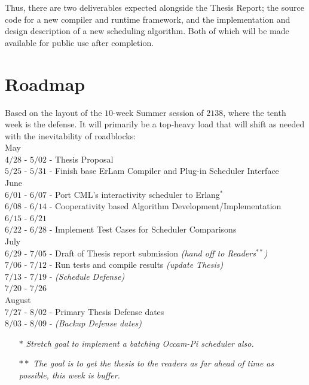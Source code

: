 Thus, there are two deliverables expected alongside the Thesis Report; the source code for a new compiler 
and runtime framework, and the implementation and design description of a new scheduling algorithm. Both
of which will be made available for public use after completion.

\pagebreak
\section{Roadmap}

Based on the layout of the $10$-week Summer session of $2138$, where the tenth week
is the defense. It will primarily be a top-heavy load that will shift as needed
with the inevitability of roadblocks:\\

    May\\
    	$4/28$ - $5/02$ - Thesis Proposal\\
        $5/25$ - $5/31$ - Finish base ErLam Compiler and Plug-in Scheduler Interface \\

    June \\
        $6/01$ - $6/07$ - Port CML's interactivity scheduler to Erlang$^*$\\
        $6/08$ - $6/14$ - Cooperativity based Algorithm Development/Implementation \\
        $6/15$ - $6/21$ \\
        $6/22$ - $6/28$ - Implement Test Cases for Scheduler Comparisons\\

    July\\
        $6/29$ - $7/05$ - Draft of Thesis report submission {\em (hand off to Readers$^{**}$)} \\
        $7/06$ - $7/12$ - Run tests and compile results {\em (update Thesis)} \\
        $7/13$ - $7/19$ - {\em(Schedule Defense)}\\
        $7/20$ - $7/26$ \\

    August\\
        $7/27$ - $8/02$ - Primary Thesis Defense dates\\
        $8/03$ - $8/09$ - {\em(Backup Defense dates)}

\begin{itemize}
\setlength{\itemsep}{1pt}
\setlength{\parskip}{0pt}
\setlength{\parsep}{0pt}
\item[$*$]{\small\em Stretch goal to implement a batching Occam-Pi scheduler also.}
\item[$**$]{\small\em The goal is to get the thesis to the readers as far ahead of time as possible, this week is buffer.}
\end{itemize}

